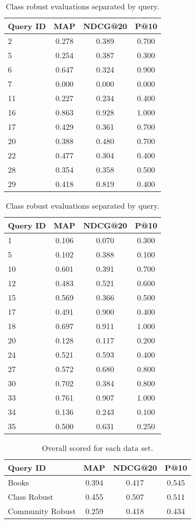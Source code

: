 \documentclass[paper=a4, fontsize=11pt]{scrartcl} %
\numberwithin{equation}{section} %
\numberwithin{figure}{section} %
\numberwithin{table}{section} %
\begin{document}
\begin{table}
\parbox{.45\linewidth}{
\label{tab:book}
\centering
\caption{Books evaluations separated by query.}
\begin{tabular}{ |l |c | c | c|}
\hline
Query ID & MAP & NDCG@20 & P@10 \\
\hline
2 & 0.278 & 0.389 & 0.700 \\
5 & 0.254 & 0.387 & 0.300 \\
6 & 0.647 & 0.324 & 0.900 \\
7 & 0.000 & 0.000 & 0.000 \\
11 & 0.227 & 0.234 & 0.400 \\
16 & 0.863 & 0.928 & 1.000 \\
17 & 0.429 & 0.361 & 0.700 \\
20 & 0.388 & 0.480 & 0.700 \\
22 & 0.477 & 0.304 & 0.400 \\
28 & 0.354 & 0.358 & 0.500 \\
29 & 0.418 & 0.819 & 0.400 \\
\hline
\end{tabular}
}
\hfill
\parbox{.45\linewidth}{
\centering
\caption{Class robust evaluations separated by query.}
\begin{tabular}{ |l |c | c | c|}
\hline
Query ID & MAP & NDCG@20 & P@10 \\
\hline
1 & 0.106 & 0.070 & 0.300 \\
5 & 0.102 & 0.388 & 0.100 \\
10 & 0.601 & 0.391 & 0.700 \\
12 & 0.483 & 0.521 & 0.600 \\
15 & 0.569 & 0.366 & 0.500 \\
17 & 0.491 & 0.900 & 0.400 \\
18 & 0.697 & 0.911 & 1.000 \\
20 & 0.128 & 0.117 & 0.200 \\
24 & 0.521 & 0.593 & 0.400 \\
27 & 0.572 & 0.680 & 0.800 \\
30 & 0.702 & 0.384 & 0.800 \\
33 & 0.761 & 0.907 & 1.000 \\
34 & 0.136 & 0.243 & 0.100 \\
35 & 0.500 & 0.631 & 0.250 \\
\hline
\end{tabular}
}
\end{table}


\begin{table}
\label{tab:all}
\centering
\caption{Overall scored for each data set.}
\begin{tabular}{ |l |c | c | c|}
\hline
Query ID & MAP & NDCG@20 & P@10 \\
\hline
Books & 0.394 & 0.417 & 0.545    \\
Class Robust & 0.455 & 0.507 & 0.511 \\
Community Robust & 0.259 & 0.418 & 0.434 \\
\hline
\end{tabular}
\end{table}
\end{document}
